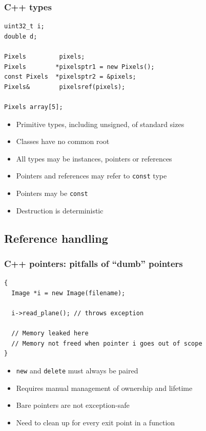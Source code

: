 \documentclass{beamer}
\begin{document}
\begin{frame}[fragile]
  \frametitle{C++ types}
  \begin{lstlisting}
uint32_t i;
double d;

Pixels         pixels;
Pixels        *pixelsptr1 = new Pixels();
const Pixels  *pixelsptr2 = &pixels;
Pixels&        pixelsref(pixels);

Pixels array[5];
\end{lstlisting}
  \begin{itemize}
  \item Primitive types, including unsigned, of standard sizes
  \item Classes have no common root
  \item All types may be instances, pointers or references
    \pause
  \item Pointers and references may refer to \texttt{const} type
    \pause
  \item Pointers may be \texttt{const}
    \pause
  \item Destruction is deterministic
  \end{itemize}
\end{frame}

\subsection{Reference handling}

\begin{frame}[fragile]
  \frametitle{C++ pointers: pitfalls of “dumb” pointers}
  \begin{lstlisting}
{
  Image *i = new Image(filename);

  i->read_plane(); // throws exception

  // Memory leaked here
  // Memory not freed when pointer i goes out of scope
}
\end{lstlisting}
  \begin{itemize}
    \item \texttt{new} and \texttt{delete} must always be paired
    \item Requires manual management of ownership and lifetime
    \item Bare pointers are not exception-safe
    \item Need to clean up for every exit point in a function
  \end{itemize}
\end{frame}
\end{document}
